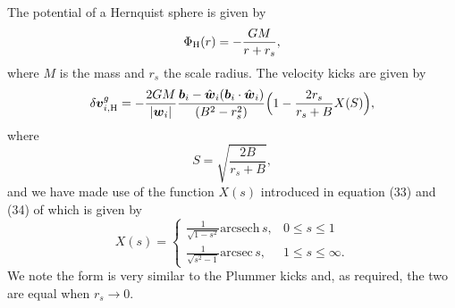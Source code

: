 \documentclass[useAMS,usenatbib,fleqn,a4paper]{mn2e}
\newcommand{\bs}[1]{\bmath{#1}}
\begin{document}
The potential of a Hernquist sphere \citep{Hernquist1990} is given by
\begin{equation}
\Phi_{\rm H}(r) = -\frac{GM}{r+r_s},
\end{equation}
where $M$ is the mass and $r_s$ the scale radius. The velocity kicks are given by
\begin{equation}
\delta\bs{v}^{g}_{i,\mathrm{H}} = -\frac{2GM}{|\bs{w}_i|}
\frac{\bs{b}_i-\hat{\bs{w}}_i(\bs{b}_i\cdot\hat{\bs{w}}_i)}
{(B^2-r_s^2)}\Big(1-\frac{2r_s}{r_s+B}X(S)\Big),
\label{curved_hernquist}
\end{equation}
where
\begin{equation}
S=\sqrt{\frac{2B}{r_s+B}},
\end{equation}
and we have made use of the function $X(s)$ introduced in equation (33) and (34) of \cite{Hernquist1990} which is given by
\begin{equation}
X(s)=\begin{cases}
    \frac{1}{\sqrt{1-s^2}}\mathrm{arcsech}\,s,& 0\leq s\leq 1\\
    \frac{1}{\sqrt{s^2-1}}\mathrm{arcsec}\,s, & 1\leq s\leq \infty.
\end{cases}
\end{equation}
We note the form is very similar to the Plummer kicks and, as required, the two are equal when $r_s\rightarrow0$.
\end{document}
